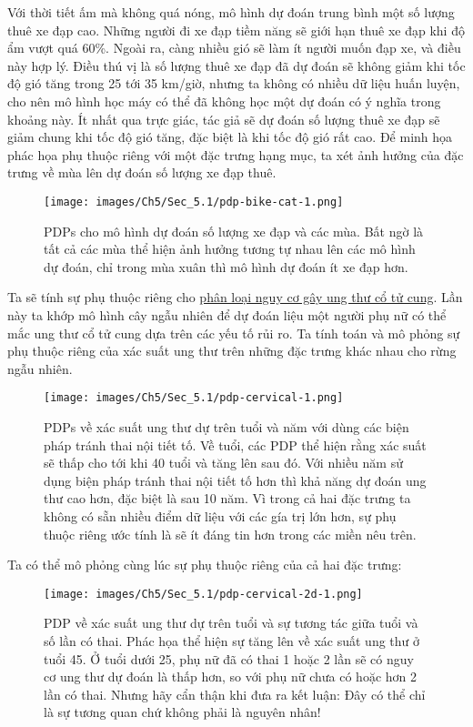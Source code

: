 Với thời tiết ấm mà không quá nóng, mô hình dự đoán trung bình một số lượng thuê xe đạp cao. Những người đi xe đạp tiềm năng sẽ giới hạn thuê xe đạp khi độ ẩm vượt quá 60\%. Ngoài ra, càng nhiều gió sẽ làm ít người muốn đạp xe, và điều này hợp lý. Điều thú vị là số lượng thuê xe đạp đã dự đoán sẽ không giảm khi tốc độ gió tăng trong 25 tới 35 km/giờ, nhưng ta không có nhiều dữ liệu huấn luyện, cho nên mô hình học máy có thể đã không học một dự đoán có ý nghĩa trong khoảng này. Ít nhất qua trực giác, tác giả sẽ dự đoán số lượng thuê xe đạp sẽ giảm chung khi tốc độ gió tăng, đặc biệt là khi tốc độ gió rất cao.
Để minh họa phác họa phụ thuộc riêng với một đặc trưng hạng mục, ta xét ảnh hưởng của đặc trưng về mùa lên dự đoán số lượng xe đạp thuê.

\begin{figure*}[h!]
	\centering
	\texttt{[image: images/Ch5/Sec\_5.1/pdp-bike-cat-1.png]}
	\label{fig:5_3}
	\caption{PDPs cho mô hình dự đoán số lượng xe đạp và các mùa. Bất ngờ là tất cả các mùa thể hiện ảnh hưởng tương tự nhau lên các mô hình dự đoán, chỉ trong mùa xuân thì mô hình dự đoán ít xe đạp hơn.}
\end{figure*}

Ta sẽ tính sự phụ thuộc riêng cho \href{chap_3.3}{phân loại nguy cơ gây ung thư cổ tử cung}. Lần này ta khớp mô hình cây ngẫu nhiên để dự đoán liệu một người phụ nữ có thể mắc ung thư cổ tử cung dựa trên các yếu tố rủi ro. Ta tính toán và mô phỏng sự phụ thuộc riêng của xác suất ung thư trên những đặc trưng khác nhau cho rừng ngẫu nhiên.

\begin{figure*}[h!]
	\centering
	\texttt{[image: images/Ch5/Sec\_5.1/pdp-cervical-1.png]}
	\label{fig:5_4}
	\caption{PDPs về xác suất ung thư dự trên tuổi và năm với dùng các biện pháp tránh thai nội tiết tố. Về tuổi, các PDP thể hiện rằng xác suất sẽ thấp cho tới khi 40 tuổi và tăng lên sau đó. Với nhiều năm sử dụng biện pháp tránh thai nội tiết tố hơn thì khả năng dự đoán ung thư cao hơn, đặc biệt là sau 10 năm. Vì trong cả hai đặc trưng ta không có sẵn nhiều điểm dữ liệu với các gía trị lớn hơn, sự phụ thuộc riêng ước tính là sẽ ít đáng tin hơn trong các miền nêu trên.}
\end{figure*}

Ta có thể mô phỏng cùng lúc sự phụ thuộc riêng của cả hai đặc trưng:


\begin{figure*}[h!]
	\centering
	\texttt{[image: images/Ch5/Sec\_5.1/pdp-cervical-2d-1.png]}
	\label{fig:5_5}
	\caption{PDP về xác suất ung thư dự trên tuổi và sự tương tác giữa tuổi và số lần có thai. Phác họa thể hiện sự tăng lên về xác suất ung thư ở tuổi 45. Ở tuổi dưới 25, phụ nữ đã có thai 1 hoặc 2 lần sẽ có nguy cơ ung thư dự đoán là thấp hơn, so với phụ nữ chưa có hoặc hơn 2 lần có thai. Nhưng hãy cẩn thận khi đưa ra kết luận: Đây có thể chỉ là sự tương quan chứ không phải là nguyên nhân!}
\end{figure*}

